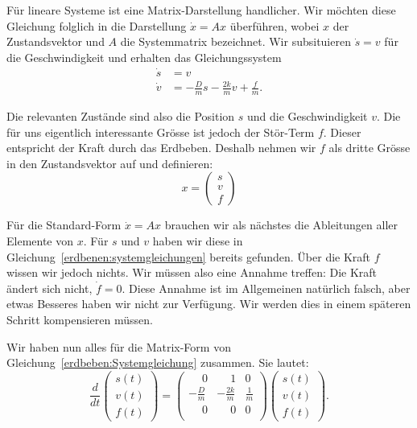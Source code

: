 Für lineare Systeme ist eine Matrix-Darstellung handlicher.
Wir möchten diese Gleichung folglich in die Darstellung $\dot x = Ax$ überführen,
wobei $x$ der Zustandsvektor und $A$ die Systemmatrix bezeichnet.
Wir subsituieren $\dot s = v$ für die Geschwindigkeit und erhalten das Gleichungssystem
\begin{align}
  \dot s &= v \\
  \dot v &= -\frac{D}{m} {s} -\frac{2k}{m} {v} + \frac{f} {m}.
  \label{erdbenen:systemgleichungen}
\end{align}

Die relevanten Zustände sind also die Position $s$ und die Geschwindigkeit $v$.
Die für uns eigentlich interessante Grösse ist jedoch der Stör-Term $f$.
Dieser entspricht der Kraft durch das Erdbeben.
Deshalb nehmen wir $f$ als dritte Grösse in den Zustandsvektor auf und definieren:
\[ 
  x = \begin{pmatrix} {s} \\ {v} \\ {f} \end{pmatrix}
\] 
  
Für die Standard-Form $\dot x = Ax$ brauchen wir als nächstes die Ableitungen aller Elemente von $x$.
Für $s$ und $v$  haben wir diese in Gleichung~\eqref{erdbenen:systemgleichungen} bereits gefunden.
Über die Kraft $f$ wissen wir jedoch nichts.
Wir müssen also eine Annahme treffen: Die Kraft ändert sich nicht, $\dot f = 0$.
Diese Annahme ist im Allgemeinen natürlich falsch, aber etwas Besseres haben wir nicht zur Verfügung.
Wir werden dies in einem späteren Schritt kompensieren müssen.

Wir haben nun alles für die Matrix-Form von Gleichung~\eqref{erdbeben:Systemgleichung} zusammen.
Sie lautet:
\begin{equation}
  \frac{d}{dt} \begin{pmatrix} s(t) \\ v(t) \\ f(t) \end{pmatrix}
  =
 \begin{pmatrix}
  \phantom- 0 & \phantom-1& 0 \\ 
  - \frac{D}{m} &-\frac{2k}{m} & \frac{1} {m} \\
  \phantom-0 & \phantom-0 & 0\\
  \end{pmatrix}
  \begin{pmatrix} s(t) \\ v(t) \\ f(t) \end{pmatrix}.
  \label{erdbeben:systemmatrix}
\end{equation}












